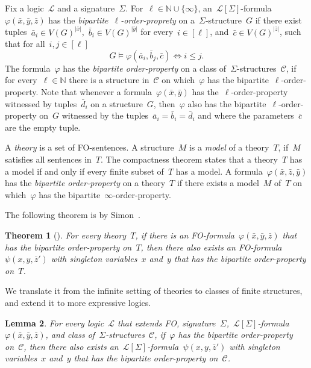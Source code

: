 \documentclass[11pt]{article}      \usepackage[margin=1in]{geometry}  \usepackage{microtype}
\newtheorem{theorem}{Theorem}[section]
\newtheorem{lemma}[theorem]{Lemma}
\theoremstyle{definition}
\newcommand{\N}[0]{\mathrm{\mathbb{N}}}
\renewcommand{\phi}{\varphi}
\newcommand{\LL}{\mathcal{L}}
\newcommand{\CC}{\mathcal{C}}
\renewcommand{\le}{\leqslant}
\renewcommand{\leq}{\le}
\begin{document}
\lemMstableTransductions*

Fix a logic~$\LL$ and a signature~$\Sigma$.
For~$\ell\in \N\cup\{\infty\}$, an~$\LL[\Sigma]$-formula~$\phi(\bar x,\bar y, \bar z)$ has the \emph{bipartite~$\ell$-order-proprety} on a~$\Sigma$-structure~$G$ if there exist tuples~$\bar a_i \in V(G)^{|\bar x|}$,~$\bar b_i \in V(G)^{|\bar y|}$ for every~$i \in [\ell]$, and~$\bar c \in V(G)^{|\bar z|}$, such that for all~$i,j \in [\ell]$
\[
    G \models \phi(\bar a_i, \bar b_j, \bar c) \Leftrightarrow i \leq j.
\]
The formula~$\phi$ has the \emph{bipartite order-property} on a class of~$\Sigma$-structures~$\CC$, if for every~$\ell\in\N$ there is a structure in~$\CC$ on which~$\phi$ has the bipartite~$\ell$-order-property.
Note that whenever a formula~$\phi(\bar x, \bar y)$ has the~$\ell$-order-property witnessed by tuples~$\bar d_i$ on a structure~$G$, then~$\phi$ also has the bipartite~$\ell$-order-property on~$G$ witnessed by the tuples~$\bar a_i = \bar b_i = \bar d_i$ and where the parameters~$\bar c$ are the empty tuple.


A \emph{theory} is a set of FO-sentences.
A structure~$M$ is a \emph{model} of a theory~$T$, if~$M$ satisfies all sentences in~$T$.
The compactness theorem states that a theory~$T$ has a model if and only if every finite subset of~$T$ has a model.
A formula~$\phi(\bar x, \bar z, \bar y)$ has the \emph{bipartite order-property} on a theory~$T$ if there exists a model~$M$ of~$T$ on which~$\phi$ has the bipartite~$\infty$-order-property.

The following theorem is by Simon~\cite{simon2021note}. 
\begin{theorem}[\cite{simon2021note}]\label{thm:simon}
    For every theory~$T$, if there is an FO-formula~$\phi(\bar x, \bar y, \bar z)$ that has the bipartite order-property on~$T$, then there also exists an FO-formula~$\psi(x,y,\bar z')$ with singleton variables~$x$ and~$y$ that has the bipartite order-property on~$T$.
\end{theorem}
We translate it from the infinite setting of theories to classes of finite structures, and extend it to more expressive logics.



\begin{lemma}\label{lem:singletons}
    For every logic~$\LL$ that extends FO, signature~$\Sigma$,~$\LL[\Sigma]$-formula~$\phi(\bar x, \bar y, \bar z)$, and class of~$\Sigma$-structures~$\CC$, if~$\phi$ has the bipartite order-property on~$\CC$, then there also exists an~$\LL[\Sigma]$-formula~$\psi(x,y,\bar z')$ with singleton variables~$x$ and~$y$ that has the bipartite order-property on~$\CC$.
\end{lemma}
\end{document}
